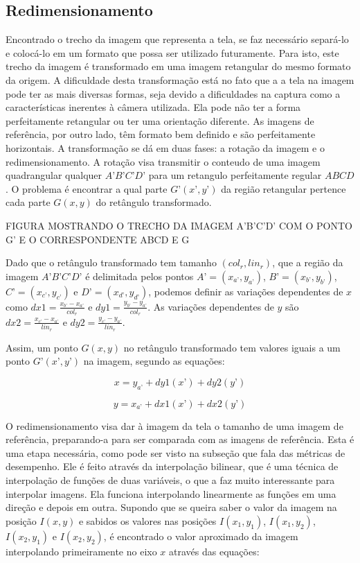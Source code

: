 \subsection{Redimensionamento}

Encontrado o trecho da imagem que representa a tela, se faz necessário separá-lo e colocá-lo em um formato que possa ser utilizado futuramente. Para isto, este trecho da imagem é transformado em uma imagem retangular do mesmo formato da origem. A dificuldade desta transformação está no fato que a a tela na imagem pode ter as mais diversas formas, seja devido a dificuldades na captura como a características inerentes à câmera utilizada. Ela pode não ter a forma perfeitamente retangular ou ter uma orientação diferente. As imagens de referência, por outro lado, têm formato bem definido e são perfeitamente horizontais.
A transformação se dá em duas fases: a rotação da imagem e o redimensionamento. A rotação visa transmitir o conteudo de uma imagem quadrangular qualquer $A’B’C’D’$ para um retangulo perfeitamente regular $ABCD$. O problema é encontrar a qual parte $G’(x’,y’)$ da região retangular pertence cada parte $G(x,y)$ do retângulo transformado.

FIGURA MOSTRANDO O TRECHO DA IMAGEM A’B’C’D’ COM O PONTO G’ E O CORRESPONDENTE ABCD E G

Dado que o retângulo transformado tem tamanho $(col_r,lin_r)$, que a região da imagem $A’B’C’D’$ é delimitada pelos pontos $A’ = (x_{a’},y_{a’})$, $B’ = (x_{b’},y_{b’})$, $C’ = (x_{c’},y_{c’})$ e $D’ = (x_{d’},y_{d’})$, podemos definir as variações dependentes de $x$ como $dx1 = \frac{x_{b’}-x_{a’}}{col_r}$ e $dy1 = \frac{y_{b’}-y_{a’}}{col_r}$. As variações dependentes de $y$ são $dx2 = \frac{x_{c’}-x_{a’}}{lin_r}$ e $dy2 = \frac{y_{c’}-y_{a’}}{lin_r}$.


Assim, um ponto $G(x,y)$ no retângulo transformado tem valores iguais a um ponto $G’(x’,y’)$ na imagem, segundo as equações:

$$ x = y_{a’} + dy1(x’) + dy2(y’) $$

$$ y = x_{a’} + dx1(x’) + dx2(y’) $$

O redimensionamento visa dar à imagem da tela o tamanho de uma imagem de referência, preparando-a para ser comparada com as imagens de referência. Esta é uma etapa necessária, como pode ser visto na subseção que fala das métricas de desempenho. Ele é feito através da interpolação bilinear, que é uma técnica de interpolação de funções de duas variáveis, o que a faz muito interessante para interpolar imagens.
Ela funciona interpolando linearmente as funções em uma direção e depois em outra. Supondo que se queira saber o valor da imagem na posição $I(x,y)$ e sabidos os valores nas posições $I(x_1,y_1)$, $I(x_1,y_2)$, $I(x_2,y_1)$ e $I(x_2,y_2)$, é encontrado o valor aproximado da imagem interpolando primeiramente no eixo $x$ através das equações:

